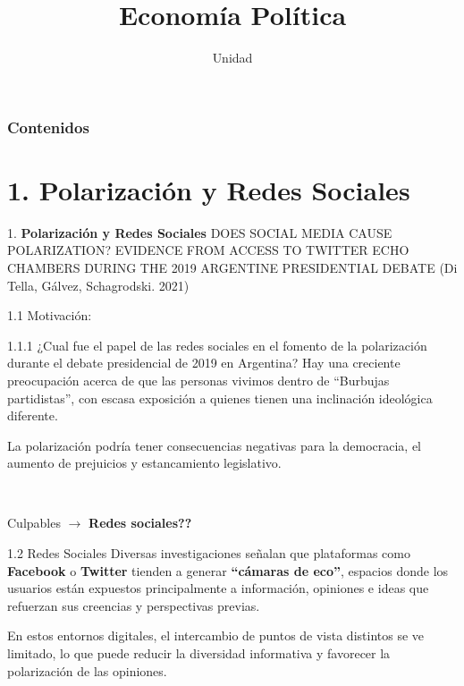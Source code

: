 \documentclass[
  11pt,
  ignorenonframetext,
  aspectratio=169,
]{beamer}
\title{Economía Política}
\subtitle{Unidad}
\author{}
\date{}
\renewcommand*\contentsname{Table of contents}
\newcommand\contentsname{Table of contents}
\begin{document}
\frame{\titlepage}

\renewcommand*\contentsname{Contenidos}
\begin{frame}[allowframebreaks]
  \frametitle{Contenidos}
  \tableofcontents[hideallsubsections]
\end{frame}

\section{\texorpdfstring{1. \textbf{Polarización y Redes
Sociales}}{1. Polarización y Redes Sociales}}\label{polarizaciuxf3n-y-redes-sociales}

\begin{frame}{1. \textbf{Polarización y Redes Sociales}}
DOES SOCIAL MEDIA CAUSE POLARIZATION? EVIDENCE FROM ACCESS TO TWITTER
ECHO CHAMBERS DURING THE 2019 ARGENTINE PRESIDENTIAL DEBATE (Di Tella,
Gálvez, Schagrodski. 2021)
\end{frame}

\begin{frame}{1.1 Motivación:}
\label{motivaciuxf3n}
\begin{block}{1.1.1 ¿Cual fue el papel de las redes sociales en el
fomento de la polarización durante el debate presidencial de 2019 en
Argentina?}
\label{cual-fue-el-papel-de-las-redes-sociales-en-el-fomento-de-la-polarizaciuxf3n-durante-el-debate-presidencial-de-2019-en-argentina}
Hay una creciente preocupación acerca de que las personas vivimos dentro
de ``Burbujas partidistas'', con escasa exposición a quienes tienen una
inclinación ideológica diferente.

La polarización podría tener consecuencias negativas para la democracia,
el aumento de prejuicios y estancamiento legislativo.

~

Culpables \(\longrightarrow\) \textbf{Redes sociales??}
\end{block}
\end{frame}

\begin{frame}{1.2 Redes Sociales}
\label{redes-sociales}
Diversas investigaciones señalan que plataformas como \textbf{Facebook}
o \textbf{Twitter} tienden a generar \textbf{``cámaras de eco''},
espacios donde los usuarios están expuestos principalmente a
información, opiniones e ideas que refuerzan sus creencias y
perspectivas previas.

En estos entornos digitales, el intercambio de puntos de vista distintos
se ve limitado, lo que puede reducir la diversidad informativa y
favorecer la polarización de las opiniones.
\end{frame}
\end{document}
